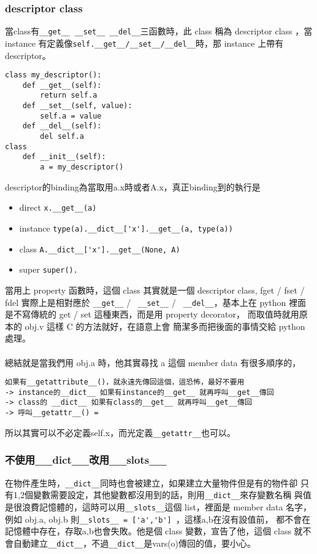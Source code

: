     \subsubsection{descriptor class}
    當class有\verb=__get__ __set__ __del__=三函數時，此 class 稱為 descriptor class
    ，當 instance 有定義像\verb=self.__get__/__set__/__del__=時，那 instance 上帶有
    descriptor。
\begin{verbatim}
class my_descriptor():
    def __get__(self):
        return self.a
    def __set__(self, value):
        self.a = value
    def __del__(self):
        del self.a
class
    def __init__(self):
        a = my_descriptor()
\end{verbatim}
    descriptor的binding為當取用a.x時或者A.x，真正binding到的執行是
    \begin{itemize}
      \item direct \verb=x.__get__(a)=
      \item instance \verb=type(a).__dict__['x'].__get__(a, type(a))=
      \item class \verb=A.__dict__['x'].__get__(None, A)=
      \item super \verb=super().=
    \end{itemize}
    當用上 property 函數時，這個 class 其實就是一個 descriptor class,
    fget / fset / fdel 實際上是相對應於 \verb=__get__= / \verb= __set__= /
    \verb= __del__=，基本上在 python 裡面是不寫傳統的 get / set 這種東西，而是用
    property decorator， 而取值時就用原本的 obj.v 這樣 C 的方法就好，在語意上會
    簡潔多而把後面的事情交給 python 處理。
    \\\\
    總結就是當我們用 obj.a 時，他其實尋找 a 這個 member data 有很多順序的，
\begin{verbatim}
如果有__getattribute__()，就永遠先傳回這個，這恐怖，最好不要用
-> instance的__dict__ 如果有instance的__get__ 就再呼叫__get__傳回
-> class的 __dict__ 如果有class的__get__ 就再呼叫__get__傳回
-> 呼叫__getattr__() =
\end{verbatim}
    所以其實可以不必定義self.x，而光定義\verb=__getattr__=也可以。

    \subsubsection{不使用\_\_dict\_\_改用\_\_slots\_\_}
    在物件產生時，\verb=__dict__=同時也會被建立，如果建立大量物件但是有的物件卻
    只有1,2個變數需要設定，其他變數都沒用到的話，則用\verb=__dict__=來存變數名稱
    與值是很浪費記憶體的，這時可以用\verb=__slots__=這個 list，裡面是 member data
    名字，例如 obj.a, obj.b 則\verb|__slots__ = ['a','b'] |，這樣a,b在沒有設值前，
    都不會在記憶體中存在，存取a,b也會失敗。他是個 class 變數，宣告了他，這個 class
    就不會自動建立\verb=__dict__=，不過\verb=__dict__=是vars(o)傳回的值，要小心。

